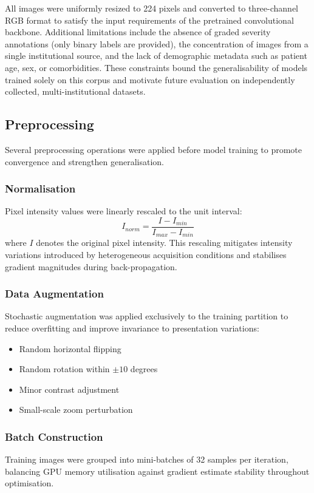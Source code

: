 \documentclass[conference]{IEEEtran}
\begin{document}
All images were uniformly resized to 224 pixels and converted to three-channel RGB format to satisfy the input requirements of the pretrained convolutional backbone. Additional limitations include the absence of graded severity annotations (only binary labels are provided), the concentration of images from a single institutional source, and the lack of demographic metadata such as patient age, sex, or comorbidities. These constraints bound the generalisability of models trained solely on this corpus and motivate future evaluation on independently collected, multi-institutional datasets.

\subsection{Preprocessing}
Several preprocessing operations were applied before model training to promote convergence and strengthen generalisation.

\subsubsection{Normalisation}
Pixel intensity values were linearly rescaled to the unit interval:
\begin{equation}
I_{norm} = \frac{I - I_{min}}{I_{max} - I_{min}}
\end{equation}
where \( I \) denotes the original pixel intensity. This rescaling mitigates intensity variations introduced by heterogeneous acquisition conditions and stabilises gradient magnitudes during back-propagation.

\subsubsection{Data Augmentation}
Stochastic augmentation was applied exclusively to the training partition to reduce overfitting and improve invariance to presentation variations:
\begin{itemize}
    \item Random horizontal flipping
    \item Random rotation within $\pm10$ degrees
    \item Minor contrast adjustment
    \item Small-scale zoom perturbation
\end{itemize}

\subsubsection{Batch Construction}
Training images were grouped into mini-batches of 32 samples per iteration, balancing GPU memory utilisation against gradient estimate stability throughout optimisation.
\end{document}
